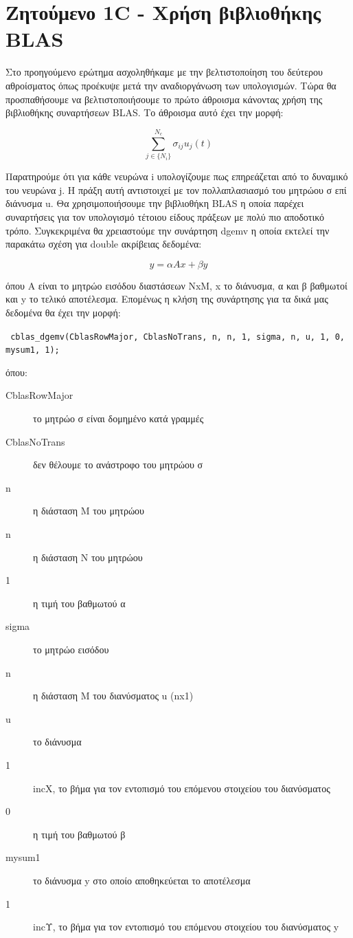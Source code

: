 \documentclass[a4paper,oneside,titlepage,10pt]{article}
\begin{document}
\newpage
\section*{Ζητούμενο 1C - Χρήση βιβλιοθήκης BLAS }

\noindent Στο προηγούμενο ερώτημα ασχοληθήκαμε με την βελτιστοποίηση του δεύτερου αθροίσματος όπως προέκυψε μετά την αναδιοργάνωση των υπολογισμών. Τώρα θα προσπαθήσουμε να βελτιστοποιήσουμε το πρώτο άθροισμα κάνοντας χρήση της βιβλιοθήκης συναρτήσεων BLAS. Το άθροισμα αυτό έχει την μορφή:

$$
\sum_{j \in \{N_{i}\}}^{N_{c}}\sigma_{ij} u_{j}(t)
$$ 

\noindent Παρατηρούμε ότι για κάθε νευρώνα i υπολογίζουμε πως επηρεάζεται από το δυναμικό του νευρώνα j. Η πράξη αυτή αντιστοιχεί με τον πολλαπλασιασμό του μητρώου σ επί διάνυσμα u. Θα χρησιμοποιήσουμε την βιβλιοθήκη BLAS η οποία παρέχει συναρτήσεις για τον υπολογισμό τέτοιου είδους πράξεων με πολύ πιο αποδοτικό τρόπο. Συγκεκριμένα θα χρειαστούμε την συνάρτηση dgemv η οποία εκτελεί την παρακάτω σχέση για double ακρίβειας δεδομένα:

$$
y = \alpha A x + \beta y
$$

\noindent όπου Α είναι το μητρώο εισόδου διαστάσεων NxM, x το διάνυσμα, α και β βαθμωτοί και y το τελικό αποτέλεσμα. Επομένως η κλήση της συνάρτησης για τα δικά μας δεδομένα θα έχει την μορφή:

\texttt{
cblas\_dgemv(CblasRowMajor, CblasNoTrans, n, n, 1, sigma, n, u, 1, 0, mysum1, 1);
}

\noindent όπου:

\vspace{-0.5cm}

\begin{description}
	\item[CblasRowMajor] το μητρώο σ είναι δομημένο κατά γραμμές 
	\item[CblasNoTrans] δεν θέλουμε το ανάστροφο του μητρώου σ
	\item[n] η διάσταση Μ του μητρώου
	\item[n] η διάσταση Ν του μητρώου
	\item[1] η τιμή του βαθμωτού α
	\item[sigma] το μητρώο εισόδου
	\item[n] η διάσταση Μ του διανύσματος u (nx1)
	\item[u] το διάνυσμα
	\item[1] incX, το βήμα για τον εντοπισμό του επόμενου στοιχείου του διανύσματος
	\item[0] η τιμή του βαθμωτού β
	\item[mysum1] το διάνυσμα y στο οποίο αποθηκεύεται το αποτέλεσμα
	\item[1] incΥ, το βήμα για τον εντοπισμό του επόμενου στοιχείου του διανύσματος y
	
\end{description}
\end{document}
